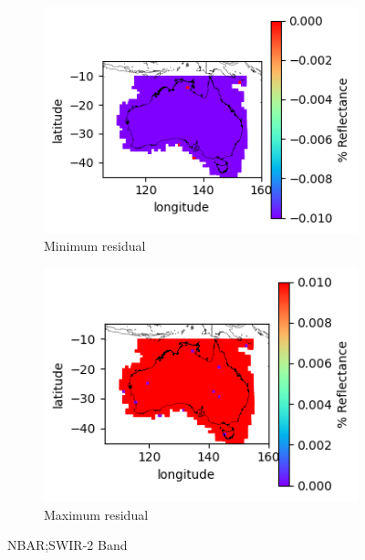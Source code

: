 \documentclass[a4paper]{article}
\begin{document}
      \begin{figure}[h!]
        \centering
          \begin{subfigure}[l]{.4\linewidth}
            \hspace{-32mm}
            \includegraphics[scale=0.9]{plots/nbar/nbar_swir_2-MinResidual.png}
            \caption{Minimum residual}
          \end{subfigure}
%
          \begin{subfigure}[r]{.4\linewidth}
            \includegraphics[scale=0.9]{plots/nbar/nbar_swir_2-MaxResidual.png}
            \caption{Maximum residual}
          \end{subfigure}
        \caption{NBAR;\@ SWIR-2 Band}\label{figure:20}
      \end{figure}

  \clearpage
\end{document}
